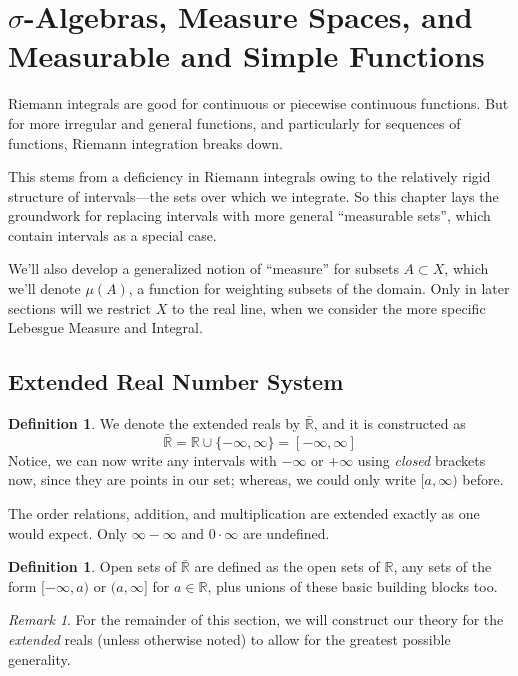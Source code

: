 \documentclass[12pt]{article}
\theoremstyle{plain}
\theoremstyle{definition}
\newtheorem{defn}[thm]{Definition}
\theoremstyle{remark}
\newtheorem*{rmk}{Remark}
\begin{document}
\newpage
\section{$\sigma$-Algebras, Measure Spaces, and Measurable and Simple Functions}

Riemann integrals are good for continuous or piecewise continuous functions.  But for more irregular and general functions, and particularly for sequences of functions, Riemann integration breaks down.

This stems from a deficiency in Riemann integrals owing to the relatively rigid structure of intervals---the sets over which we integrate. So this chapter lays the groundwork for replacing intervals with more general ``measurable sets'', which contain intervals as a special case.

We'll also develop a generalized notion of ``measure'' for subsets $A\subset X$, which we'll denote $\mu(A)$, a function for weighting subsets of the domain. Only in later sections will we restrict $X$ to the real line, when we consider the more specific Lebesgue Measure and Integral.



\subsection{Extended Real Number System}

\begin{defn}
We denote the extended reals by $\bar{\mathbb{R}}$, and it is constructed as 
\[ 
    \bar{\mathbb{R}} = {\mathbb{R}} \cup \{-\infty, \infty\}
    = [-\infty,\infty]
\]
Notice, we can now write any intervals with $-\infty$ or $+\infty$ using \emph{closed} brackets now, since they are points in our set; whereas, we could only write $[a,\infty)$ before.

The order relations, addition, and multiplication are extended exactly as one would expect. Only $\infty-\infty$ and $0\cdot \infty$ are undefined.
\end{defn}

\begin{defn}
Open sets of $\bar{\mathbb{R}}$ are defined as the open sets of $\mathbb{R}$, any sets of the form $[-\infty, a)$ or $(a,\infty]$ for $a\in\mathbb{R}$, plus unions of these basic building blocks too.
\end{defn}

\begin{rmk}
For the remainder of this section, we will construct our theory for the \emph{extended} reals (unless otherwise noted) to allow for the greatest possible generality.
\end{rmk}
\end{document}
